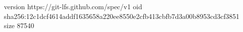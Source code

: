 version https://git-lfs.github.com/spec/v1
oid sha256:12c1dcf4614addf1635658a220ee8550e2cfb413cbfb7d3a00b8953cd3cf3851
size 87540
